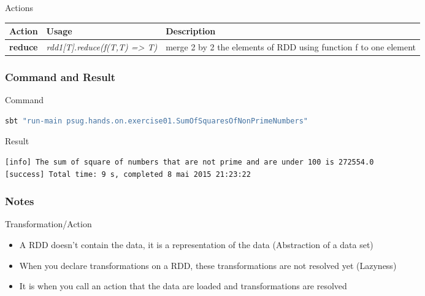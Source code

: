 \documentclass[slidetop,9pt,utf8]{beamer}
\begin{document}
\begin{CJK}{UTF8}{gbsn}
\begin{frame}
  \begin{block}{Actions}
    \begin{center}
      \begin{tabular}{|m{2.1cm}|m{3.5cm}|m{5cm}|}
        \hline 
        \rowcolor{gray} \textbf{Action} & \textbf{Usage} & \textbf{Description} \\ \hline
        \textbf{reduce} & \textit{rdd1[T].reduce(f(T,T) =\textgreater\xspace T)} & merge 2 by 2 the elements of RDD using function f to one element \\ \hline
      \end{tabular}
    \end{center}
  \end{block}

\end{frame}

\begin{frame}[fragile]
  \frametitle{Command and Result}

  \begin{block}{Command}
    \begin{lstlisting}[language=bash, style=terminal-medium]
sbt "run-main psug.hands.on.exercise01.SumOfSquaresOfNonPrimeNumbers"
    \end{lstlisting}
  \end{block}

  \begin{block}{Result}
    \begin{lstlisting}[language=bash, style=terminal]
[info] The sum of square of numbers that are not prime and are under 100 is 272554.0
[success] Total time: 9 s, completed 8 mai 2015 21:23:22
    \end{lstlisting}
  \end{block}

\end{frame}

\begin{frame}
  \frametitle{Notes}

  \begin{exampleblock}{Transformation/Action}
    \begin{itemize}
      \item A RDD doesn't contain the data, it is a representation of the data (Abstraction of a data set)
      \item When you declare transformations on a RDD, these transformations are not resolved yet (Lazyness)
      \item It is when you call an action that the data are loaded and transformations are resolved
    \end{itemize}
  \end{exampleblock}


\end{frame}
\end{CJK}
\end{document}
